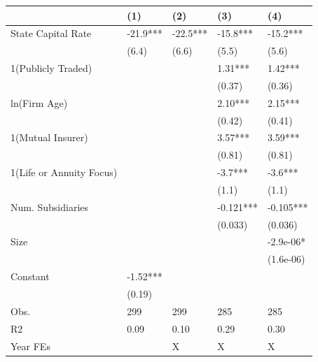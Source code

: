 \begin{tabular}{lllll}
\hline
& (1) & (2) & (3) & (4) \\ \hline
State Capital Rate       & -21.9*** & -22.5*** & -15.8***  & -15.2***  \\
& (6.4)    & (6.6)    & (5.5)     & (5.6)     \\
1(Publicly Traded)       &          &          & 1.31***   & 1.42***   \\
&          &          & (0.37)    & (0.36)    \\
ln(Firm Age)             &          &          & 2.10***   & 2.15***   \\
&          &          & (0.42)    & (0.41)    \\
1(Mutual Insurer)        &          &          & 3.57***   & 3.59***   \\
&          &          & (0.81)    & (0.81)    \\
1(Life or Annuity Focus) &          &          & -3.7***   & -3.6***   \\
&          &          & (1.1)     & (1.1)     \\
Num. Subsidiaries        &          &          & -0.121*** & -0.105*** \\
&          &          & (0.033)   & (0.036)   \\
Size                     &          &          &           & -2.9e-06* \\
&          &          &           & (1.6e-06) \\
Constant                 & -1.52*** &          &           &           \\
& (0.19)   &          &           &           \\
Obs.                     & 299      & 299      & 285       & 285       \\
R2                       & 0.09     & 0.10     & 0.29      & 0.30      \\
Year FEs                 &          & X        & X         & X         \\
\hline
\end{tabular}
